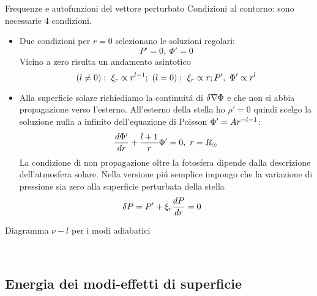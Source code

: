 \begin{frame}{Frequenze e autofunzioni del vettore perturbato}
Condizioni al contorno: sono necessarie 4 condizioni.
\begin{itemize}
\item Due condizioni per $r=0$ selezionano le soluzioni regolari:
\begin{equation}
P'=0,\ \Phi'=0
\end{equation}
Vicino a zero risulta un andamento asintotico
\begin{equation}
(l\neq0):\ \xi_r\propto r\expy{l-1};\ (l=0):\ \xi_r\propto r;P',\ \Phi'\propto r^l
\end{equation}

\item Alla superficie solare richiediamo la continuit\'a di $\Lvar{\nabla\Phi}$ e che non si abbia propagazione verso l'esterno.
All'esterno della stella ho $\rho'=0$ quindi scelgo la soluzione nulla a infinito dell'equazione di Poisson $\Phi'=Ar\expy{-l-1}$:
\begin{equation}
\TDy{r}{\Phi'}+\frac{l+1}{r}\Phi'=0,\ r=\rsun{}    
\end{equation}
La condizione di non propagazione oltre la fotosfera dipende dalla descrizione dell'atmosfera solare. Nella versione pi\'u semplice impongo che la variazione di pressione sia zero alla superficie perturbata della stella
\begin{align}
&\Lvar{P}=P'+\xi_r\TDy{r}{P}=0
\end{align}
\end{itemize}

\end{frame}

\begin{frame}{Diagramma $\nu-l$ per i modi adiabatici}

\begin{figure}[!ht]
\label{fig:midlmodes}
~
\label{fig:nrmodesLAWE}

\end{figure}

\end{frame}

\subsection{Energia dei modi-effetti di superficie}

